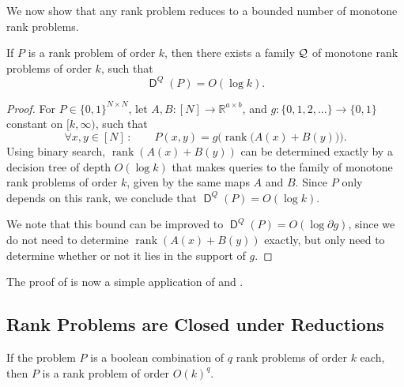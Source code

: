 \documentclass{article}
\DeclareMathOperator{\rank}{rank}
\DeclareMathOperator{\D}{\mathsf{D}}
\newcommand{\R}{\mathbb{R}}
\begin{document}
We now show that any rank problem reduces to a bounded number of monotone rank problems.

\begin{lemma}
If $P$ is a rank problem of order $k$, then there exists a family $\mathcal{Q}$
of monotone rank problems of order $k$, such that
\[
    \D^Q(P) = O(\log k).
\]
\end{lemma}

\begin{proof}
	For $P\in\{0,1\}^{N\times N}$, let $A,B\colon [N] \to \R^{a\times b}$, and $g\colon \{0,1,2,\dots\}\to \{0,1\}$ constant on $[k,\infty )$, such that
\[
	\forall x,y\in[N]\,\colon\qquad P(x,y) = g\Big(\rank\!\big(A(x)+B(y)\big)\Big).
\]
	Using binary search, $\rank(A(x)+B(y))$ can be determined exactly by a decision tree of depth $O(\log k)$ that makes queries to the family of monotone rank problems of order $k$, given by the same maps $A$ and $B$. Since $P$ only depends on this rank, we conclude that $\D^Q(P) = O(\log k)$.
	
	We note that this bound can be improved to $\D^Q(P) = O(\log \partial g)$, since we do not need to determine $\rank(A(x)+B(y))$ exactly, but only need to determine whether or not it lies in the support of $g$.
\end{proof}

The proof of  is now a simple application of  and .

\subsection{Rank Problems are Closed under Reductions}
\label{section:rank-closure-reductions}

\begin{boxlemma}
\label{thm:rank-problem-reduction}
If the problem $P$ is a boolean combination of $q$ rank problems of order $k$
each, then $P$ is a rank problem of order $O(k)^q$.
\end{boxlemma}
\end{document}
